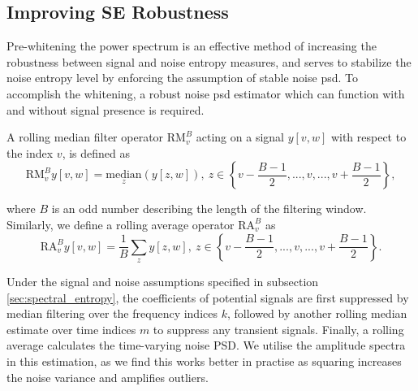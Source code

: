 {%


\subsection{Improving SE Robustness}

Pre-whitening the power spectrum is an effective method of increasing the robustness between signal and noise entropy measures, and serves to stabilize the noise entropy level by enforcing the assumption of stable noise \ac{psd}. To accomplish the whitening, a robust noise \ac{psd} estimator which can function with and without signal presence is required. 

A rolling median filter operator $\text{RM}_v^B$ acting on a signal $y[v, w]$ with respect to the index $v$, is defined as
\begin{equation}
    \text{RM}_v^B y[v, w] = \underset{z}{\text{median}}(y[z,w]), \ z \in \left\{v - \frac{B-1}{2}, ..., v, ..., v + \frac{B-1}{2}\right\},
\end{equation}

\noindent where $B$ is an odd number describing the length of the filtering window. Similarly, we define a rolling average operator $\text{RA}_v^B$ as
\begin{equation}
    \text{RA}_v^B y[v, w] = \frac{1}{B}\sum_z y[z,w], \ z \in \left\{v - \frac{B-1}{2}, ..., v, ..., v + \frac{B-1}{2}\right\}.
\end{equation}

Under the signal and noise assumptions specified in subsection \ref{sec:spectral_entropy}, the coefficients of potential signals are first suppressed by median filtering over the frequency indices $k$, followed by another rolling median estimate over time indices $m$ to suppress any transient signals. Finally, a rolling average calculates the time-varying noise PSD. We utilise the amplitude spectra in this estimation, as we find this works better in practise as squaring increases the noise variance and amplifies outliers.

}
